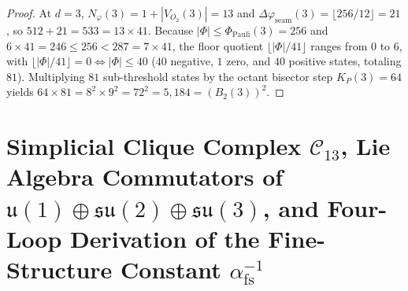\documentclass[11pt,a4paper]{article}
\theoremstyle{plain}
\theoremstyle{definition}
\begin{document}
\begin{proof}
At $d = 3$, $N_\varphi(3) = 1 + |V_{O_2}(3)| = 13$ and $\Delta\varphi_{\mathrm{seam}}(3) = \lfloor 256 / 12\rfloor = 21$, so $512 + 21 = 533 = 13 \times 41$. Because $|\Phi| \le \Phi_{\mathrm{Pauli}}(3) = 256$ and $6 \times 41 = 246 \le 256 < 287 = 7 \times 41$, the floor quotient $\lfloor |\Phi|/41\rfloor$ ranges from $0$ to $6$, with $\lfloor |\Phi|/41\rfloor = 0 \iff |\Phi| \le 40$ ($40$ negative, $1$ zero, and $40$ positive states, totaling $81$). Multiplying $81$ sub-threshold states by the octant bisector step $K_P(3) = 64$ yields $64 \times 81 = 8^2 \times 9^2 = 72^2 = 5,184 = (B_2(3))^2$.
\end{proof}

\section{Simplicial Clique Complex \texorpdfstring{$\mathcal{C}_{13}$}{C13}, Lie Algebra Commutators of \texorpdfstring{$\mathfrak{u}(1)\oplus\mathfrak{su}(2)\oplus\mathfrak{su}(3)$}{u(1)+su(2)+su(3)}, and Four-Loop Derivation of the Fine-Structure Constant \texorpdfstring{$\alpha_{\mathrm{fs}}^{-1}$}{alpha\_fs\^{}(-1)}}
\label{sec:sm-alpha}
\end{document}
